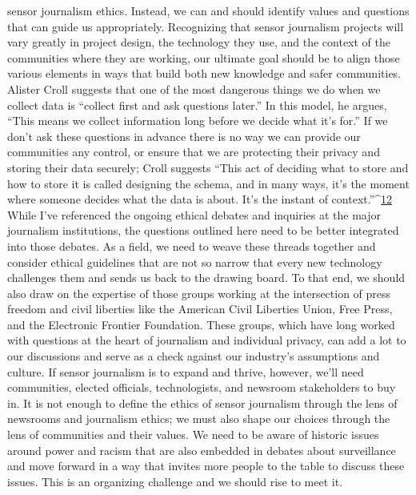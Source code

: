 sensor journalism ethics. Instead, we can and should identify values and
questions that can guide us appropriately. Recognizing that sensor journalism projects will vary greatly in project design, the technology they use,
and the context of the communities where they are working, our ultimate
goal should be to align those various elements in ways that build both new
knowledge and safer communities.
Alister Croll suggests that one of the most dangerous things we do when we
collect data is ``collect first and ask questions later.'' In this model, he argues,
``This means we collect information long before we decide what it's for.'' If
we don't ask these questions in advance there is no way we can provide our
communities any control, or ensure that we are protecting their privacy and
storing their data securely; Croll suggests ``This act of deciding what to store
and how to store it is called designing the schema, and in many ways, it's the
moment where someone decides what the data is about. It's the instant
of context.''^{\href{#endnotes-stearns}{12}}
While I've referenced the ongoing ethical debates and inquiries at the
major journalism institutions, the questions outlined here need to be better
integrated into those debates. As a field, we need to weave these threads
together and consider ethical guidelines that are not so narrow that every
new technology challenges them and sends us back to the drawing board.
To that end, we should also draw on the expertise of those groups working
at the intersection of press freedom and civil liberties like the American
Civil Liberties Union, Free Press, and the Electronic Frontier Foundation.
These groups, which have long worked with questions at the heart of journalism
and individual privacy, can add a lot to our discussions and serve as
a check against our industry's assumptions and culture.
If sensor journalism is to expand and thrive, however, we'll need communities,
elected officials, technologists, and newsroom stakeholders to buy in.
It is not enough to define the ethics of sensor journalism through the lens of
newsrooms and journalism ethics; we must also shape our choices through
the lens of communities and their values. We need to be aware of historic issues around power and racism that are also embedded in debates about
surveillance and move forward in a way that invites more people to the table
to discuss these issues. This is an organizing challenge and we should rise
to meet it.

